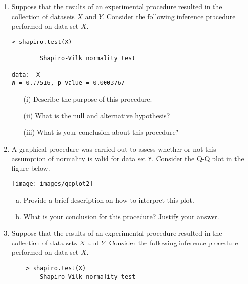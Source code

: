 \documentclass[a4paper,12pt]{article}
\begin{document}

\begin{enumerate}

\item Suppose that the results of an experimental procedure resulted in the collection of datasets $X$ and $Y$. Consider the following inference procedure performed on data set $X$.
\begin{center}
\begin{framed}
\begin{verbatim}
> shapiro.test(X)

        Shapiro-Wilk normality test

data:  X
W = 0.77516, p-value = 0.0003767
\end{verbatim}
\end{framed}
\end{center}


\begin{itemize}
	\item[(i)] Describe the purpose of this procedure.
	\item[(ii)] What is the null and alternative hypothesis?
	\item[(iii)] What is your conclusion about this procedure?
\end{itemize}
\smallskip

\item A graphical procedure was carried out to assess whether or not this assumption of normality is valid for data set \texttt{Y}. Consider the Q-Q plot in the figure below.

\begin{center}
	\texttt{[image: images/qqplot2]}
\end{center}

\begin{enumerate}[(a)]
	\item Provide a brief description on how to interpret this plot.
	\item What is your conclusion for this procedure? Justify your answer.
\end{enumerate}

\newpage
\item Suppose that the results of an experimental procedure resulted in the collection of data sets $X$ and $Y$. Consider the following inference procedure performed on data set $X$.
\begin{center}
\begin{framed}
	\begin{verbatim}
	> shapiro.test(X)
        Shapiro-Wilk normality test


\end{verbatim}
\end{framed}
\end{center}
\end{enumerate}
\end{document}
